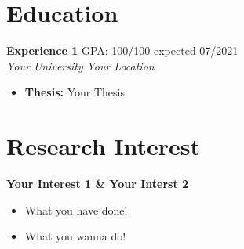 \documentclass[11pt]{cv}
\begin{document}
\section{{Education}\xfilll[0pt]{0.5pt}}
{\bf Experience 1 } {GPA: 100/100} \hfill { expected 07/2021} 
    \\ {\em Your University } \hfill {\em Your Location}
    \begin{itemize}
        \item {\bf Thesis:} Your Thesis
    \end{itemize}

\section*{{\Large Research Interest}\xfilll[0pt]{0.5pt}}
    {\bf Your Interest 1 \& Your Interst 2}
    \begin{itemize}
        \item What you have done!
        \item What you wanna do!
    \end{itemize}
\end{document}
